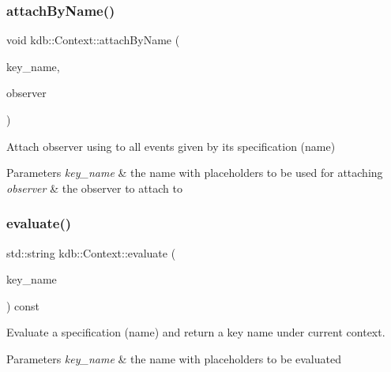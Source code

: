 \subsubsection{\texorpdfstring{attach\+By\+Name()}{attachByName()}}
{\footnotesize\ttfamily void kdb\+::\+Context\+::attach\+By\+Name (\begin{DoxyParamCaption}\item[{std\+::string const \&}]{key\+\_\+name,  }\item[{\hyperlink{classkdb_1_1ValueObserver}{Value\+Observer} \&}]{observer }\end{DoxyParamCaption})\hspace{0.3cm}{\ttfamily [inline]}}



Attach observer using to all events given by its specification (name) 


\begin{DoxyParams}{Parameters}
{\em key\+\_\+name} & the name with placeholders to be used for attaching \\
\hline
{\em observer} & the observer to attach to \\
\hline
\end{DoxyParams}
\mbox{\label{classkdb_1_1Context_a7cf9cda848595583ea35c8041d6466ee}} 
\subsubsection{\texorpdfstring{evaluate()}{evaluate()}\hspace{0.1cm}{\footnotesize\ttfamily [1/2]}}
{\footnotesize\ttfamily std\+::string kdb\+::\+Context\+::evaluate (\begin{DoxyParamCaption}\item[{std\+::string const \&}]{key\+\_\+name }\end{DoxyParamCaption}) const\hspace{0.3cm}{\ttfamily [inline]}}



Evaluate a specification (name) and return a key name under current context. 


\begin{DoxyParams}{Parameters}
{\em key\+\_\+name} & the name with placeholders to be evaluated \\
\hline
\end{DoxyParams}
\mbox{\label{classkdb_1_1Context_a50ecf7ad3b5685f11a0bdaa65abd8f62}} 
